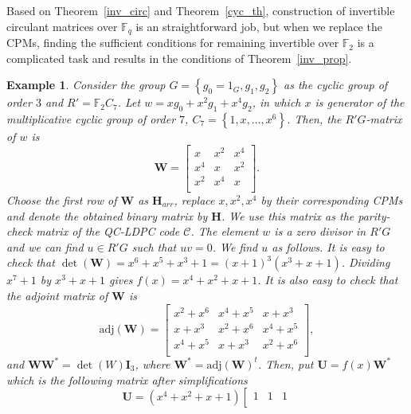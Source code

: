 \documentclass[journal,draftclsnofoot,onecolumn,12pt,twoside]{IEEEtran}
\newtheorem{Example}{Example}
\begin{document}
Based on Theorem~\ref{inv_circ} and Theorem~\ref{cyc_th}, construction of invertible circulant matrices over $\mathbb{F}_q$ is an straightforward job, but when we replace the CPMs, finding the sufficient conditions for remaining invertible over $\mathbb{F}_2$ is a complicated task and results in the conditions of  Theorem~\ref{inv_prop}.
\begin{Example}
Consider the  group $G=\left\{g_0=1_G,g_1,g_2\right\}$ as the cyclic group of order $3$ and $R'=\mathbb{F}_2C_7$. Let $w=xg_0+x^2g_1+x^4g_2$, in which $x$ is generator of the multiplicative cyclic group of order $7$, $C_7=\left\{1,x,\ldots ,x^6\right\}$. Then, the $R'G$-matrix of $w$ is
\begin{equation}\label{W_ex}
\mathbf{W}=\left[
    \begin{array}{ccc}
      x & x^2 & x^4 \\
      x^4 & x & x^2 \\
      x^2 & x^4 & x \\
    \end{array}
  \right].
\end{equation}
Choose  the first row of $\mathbf{W}$ as $\mathbf{H}_{arr}$, replace  $x,x^2,x^4$ by their corresponding CPMs and denote the obtained binary matrix by $\mathbf{H}$. We use this matrix as the parity-check matrix of the QC-LDPC code $\mathcal{C}$. The element $w$ is a zero divisor in $R'G$ and we can find $u\in R'G$ such that $uv=0$. We find $u$ as follows. It is easy to check that $\det (\mathbf{W})=x^6+x^5+x^3+1=(x+1)^3(x^3+x+1)$. Dividing $x^7+1$ by $x^3+x+1$ gives $f(x)=x^4+x^2+x+1$. It is also easy to check that the adjoint matrix of $\mathbf{W}$ is
\begin{equation}\label{adj}
\textrm{adj}\left(\mathbf{W}\right)=\left[
    \begin{array}{ccc}
      x^2+x^6 & x^4+x^5 & x+x^3 \\
      x+x^3 & x^2+x^6 & x^4+x^5 \\
      x^4+x^5 & x+x^3 & x^2+x^6 \\
    \end{array}
  \right],
\end{equation}
and $\mathbf{W}\mathbf{W}^{*}=\det(W)\mathbf{I}_3$, where $\mathbf{W}^{*}=\textrm{adj}\left(\mathbf{W}\right)^t$. Then, put $\mathbf{U}=f(x)\mathbf{W}^{*}$ which is the following matrix after simplifications
\begin{equation*}
\mathbf{U}=(x^4+x^2+x+1)\left[
    \begin{array}{ccc}
       1 & 1 & 1 \\

\end{array}
\end{equation*}
\end{Example}
\end{document}
